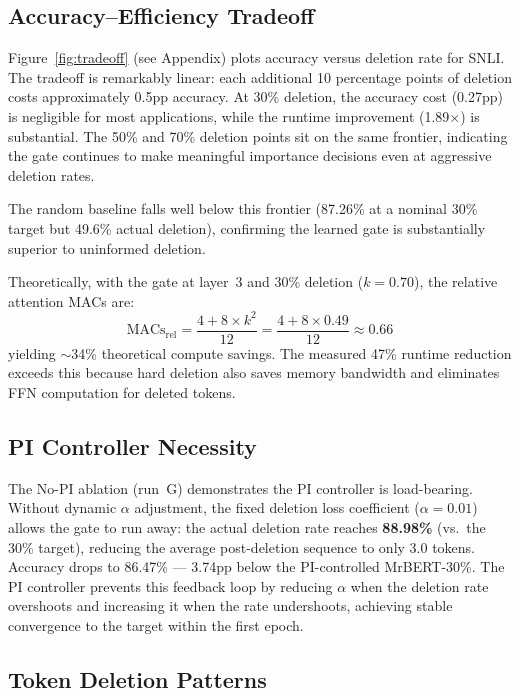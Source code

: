 \subsection{Accuracy--Efficiency Tradeoff}
\label{sec:tradeoff}

Figure~\ref{fig:tradeoff} (see Appendix) plots accuracy versus deletion rate for SNLI.
The tradeoff is remarkably linear: each additional 10 percentage points of deletion costs approximately 0.5pp accuracy.
At 30\% deletion, the accuracy cost (0.27pp) is negligible for most applications, while the runtime improvement (1.89$\times$) is substantial.
The 50\% and 70\% deletion points sit on the same frontier, indicating the gate continues to make meaningful importance decisions even at aggressive deletion rates.

The random baseline falls well below this frontier (87.26\% at a nominal 30\% target but 49.6\% actual deletion), confirming the learned gate is substantially superior to uninformed deletion.

Theoretically, with the gate at layer~3 and 30\% deletion ($k = 0.70$), the relative attention MACs are:
\begin{equation}
    \text{MACs}_{\text{rel}} = \frac{4 + 8 \times k^2}{12} = \frac{4 + 8 \times 0.49}{12} \approx 0.66
\end{equation}
yielding $\sim$34\% theoretical compute savings. The measured 47\% runtime reduction exceeds this because hard deletion also saves memory bandwidth and eliminates FFN computation for deleted tokens.


\subsection{PI Controller Necessity}
\label{sec:pi-necessity}

The No-PI ablation (run~G) demonstrates the PI controller is load-bearing.
Without dynamic $\alpha$ adjustment, the fixed deletion loss coefficient ($\alpha = 0.01$) allows the gate to run away: the actual deletion rate reaches \textbf{88.98\%} (vs.\ the 30\% target), reducing the average post-deletion sequence to only 3.0 tokens.
Accuracy drops to 86.47\% --- 3.74pp below the PI-controlled MrBERT-30\%.
The PI controller prevents this feedback loop by reducing $\alpha$ when the deletion rate overshoots and increasing it when the rate undershoots, achieving stable convergence to the target within the first epoch.


\subsection{Token Deletion Patterns}
\label{sec:deletion-patterns}

